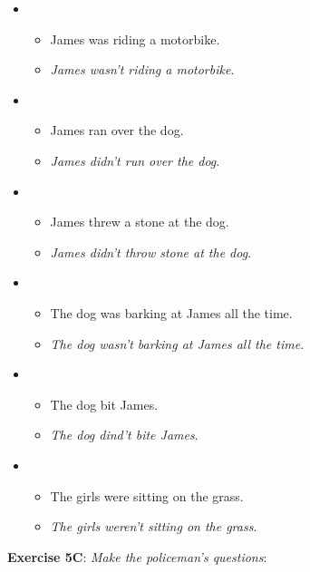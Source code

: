 \begin{itemize}

\item
\begin{itemize}
\item James was riding a motorbike.
\item \textit{James wasn't riding a motorbike}.
\end{itemize}

\item
\begin{itemize}
\item James ran over the dog.
\item \textit{James didn't run over the dog}.
\end{itemize}

\item
\begin{itemize}
\item James threw a stone at the dog.
\item \textit{James didn't throw stone at the dog}.
\end{itemize}

\item
\begin{itemize}
\item The dog was barking at James all the time.
\item \textit{The dog wasn't barking at James all the time}.
\end{itemize}

\item
\begin{itemize}
\item The dog bit James.
\item \textit{The dog dind't bite James}.
\end{itemize}

\item
\begin{itemize}
\item The girls were sitting on the grass.
\item \textit{The girls weren't sitting on the grass}.
\end{itemize}

\end{itemize}

\textbf{Exercise 5C}: \textit{Make the policeman's questions}:

